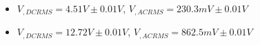 \begin{itemize}
     \item $V_{, DCRMS}=4.51V\pm 0.01\unit{V}$, $V_{, ACRMS}=230.3mV\pm 0.01\unit{V}$ 
     \item $V_{, DCRMS}=12.72V\pm 0.01\unit{V}$, $V_{, ACRMS}=862.5mV\pm 0.01\unit{V}$\\
\end{itemize}